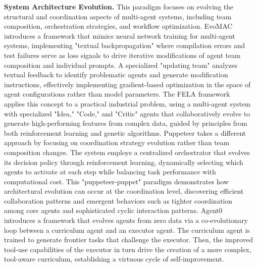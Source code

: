 \documentclass[10pt]{article} %
\begin{document}
\textbf{System Architecture Evolution.}
This paradigm focuses on evolving the structural and coordination aspects of multi-agent systems, including team composition, orchestration strategies, and workflow optimization. 
EvoMAC \citep{hu2024self} introduces a framework that mimics neural network training for multi-agent systems, implementing "textual backpropagation" where compilation errors and test failures serve as loss signals to drive iterative modifications of agent team composition and individual prompts. A specialized "updating team" analyzes textual feedback to identify problematic agents and generate modification instructions, effectively implementing gradient-based optimization in the space of agent configurations rather than model parameters. The FELA framework~\citep{wang2025fela} applies this concept to a practical industrial problem, using a multi-agent system with specialized "Idea," "Code," and "Critic" agents that collaboratively evolve to generate high-performing features from complex data, guided by principles from both reinforcement learning and genetic algorithms. Puppeteer \citep{dang2025multi} takes a different approach by focusing on coordination strategy evolution rather than team composition changes. The system employs a centralized orchestrator that evolves its decision policy through reinforcement learning, dynamically selecting which agents to activate at each step while balancing task performance with computational cost. This "puppeteer-puppet" paradigm demonstrates how architectural evolution can occur at the coordination level, discovering efficient collaboration patterns and emergent behaviors such as tighter coordination among core agents and sophisticated cyclic interaction patterns. Agent0~\citep{xia2025agent0} introduces a framework that evolves agents from zero data via a co-evolutionary loop between a curriculum agent and an executor agent. The curriculum agent is trained to generate frontier tasks that challenge the executor. Then, the improved tool-use capabilities of the executor in turn drive the creation of a more complex, tool-aware curriculum, establishing a virtuous cycle of self-improvement.
\end{document}
